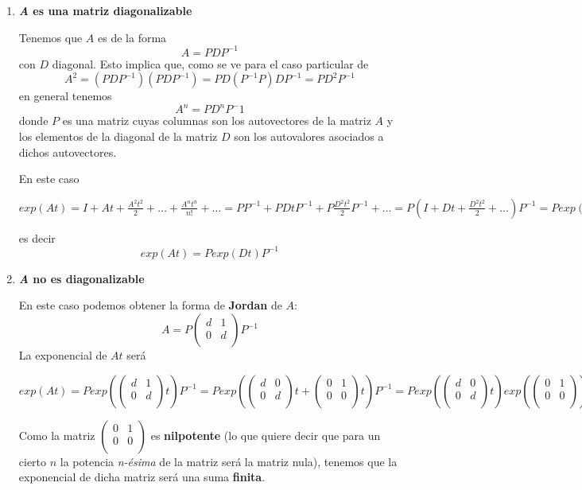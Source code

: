 \documentclass{mathnotes}
\begin{document}
\begin{enumerate}
\item \textbf{\textit{A} es una matriz diagonalizable}

Tenemos que $A$ es de la forma $$A = PDP^{-1}$$ con $D$ diagonal. Esto implica que, como se ve para el caso particular de $$A^2 = (PDP^{-1})(PDP^{-1}) = PD(P^{-1}P)DP^{-1} = PD^2P^{-1}$$ en general tenemos $$A^n = PD^nP^-1$$ donde $P$ es una matriz cuyas columnas son los autovectores de la matriz $A$ y los elementos de la diagonal de la matriz $D$ son los autovalores asociados a dichos autovectores.

En este caso 
\begin{center}
$exp(At) = I + At + \frac{A^2t^2}{2} + \hdots +\frac{A^nt^n}{n!} + \hdots =PP^{-1} + PDtP^{-1} + P\frac{D^2t^2}{2}P^{-1} + \hdots = P(I+Dt+\frac{D^2t^2}{2}+\hdots)P^{-1} = Pexp(Dt)P^{-1}$
\end{center}
es decir
$$exp(At) = Pexp(Dt)P^{-1}$$

\item \textbf{\textit{A} no es diagonalizable}

En este caso podemos obtener la forma de \textbf{Jordan} de $A$:
$$A = P\begin{pmatrix}
d & 1\\0 & d\\
\end{pmatrix}P^{-1}$$
La exponencial de $At$ será
\begin{center}
$exp(At) = Pexp({\begin{pmatrix}
d & 1\\0 & d\\
\end{pmatrix}t})P^{-1} = Pexp({\begin{pmatrix}
d & 0\\0 & d\\
\end{pmatrix}t + \begin{pmatrix}
0 & 1\\ 0 & 0\\
\end{pmatrix}}t)P^{-1} = Pexp(\begin{pmatrix}
d & 0\\ 0 & d\\
\end{pmatrix}t)exp(\begin{pmatrix}
0 & 1\\ 0 & 0\\
\end{pmatrix})P^{-1}$
\end{center}
Como la matriz $\begin{pmatrix}
0 & 1\\ 0 & 0\\
\end{pmatrix}$ es \textbf{nilpotente} (lo que quiere decir que para un cierto $n$ la potencia \textit{n-ésima} de la matriz será la matriz nula), tenemos que la exponencial de dicha matriz será una suma \textbf{finita}.
\end{enumerate}
\end{document}
